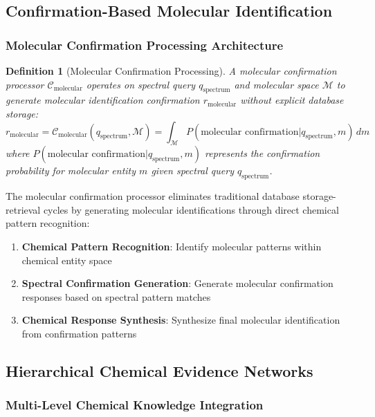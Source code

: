 \documentclass[11pt,a4paper]{article}
\newtheorem{definition}[theorem]{Definition}
\theoremstyle{remark}
\begin{document}
\subsection{Confirmation-Based Molecular Identification}

\subsubsection{Molecular Confirmation Processing Architecture}

\begin{definition}[Molecular Confirmation Processing]
A molecular confirmation processor $\mathcal{C}_{\text{molecular}}$ operates on spectral query $q_{\text{spectrum}}$ and molecular space $\mathcal{M}$ to generate molecular identification confirmation $r_{\text{molecular}}$ without explicit database storage:
\begin{equation}
r_{\text{molecular}} = \mathcal{C}_{\text{molecular}}(q_{\text{spectrum}}, \mathcal{M}) = \int_{\mathcal{M}} P(\text{molecular confirmation} | q_{\text{spectrum}}, m) \, dm
\end{equation}
where $P(\text{molecular confirmation} | q_{\text{spectrum}}, m)$ represents the confirmation probability for molecular entity $m$ given spectral query $q_{\text{spectrum}}$.
\end{definition}

The molecular confirmation processor eliminates traditional database storage-retrieval cycles by generating molecular identifications through direct chemical pattern recognition:

\begin{enumerate}
\item \textbf{Chemical Pattern Recognition}: Identify molecular patterns within chemical entity space
\item \textbf{Spectral Confirmation Generation}: Generate molecular confirmation responses based on spectral pattern matches
\item \textbf{Chemical Response Synthesis}: Synthesize final molecular identification from confirmation patterns
\end{enumerate}

\subsection{Hierarchical Chemical Evidence Networks}

\subsubsection{Multi-Level Chemical Knowledge Integration}
\end{document}
